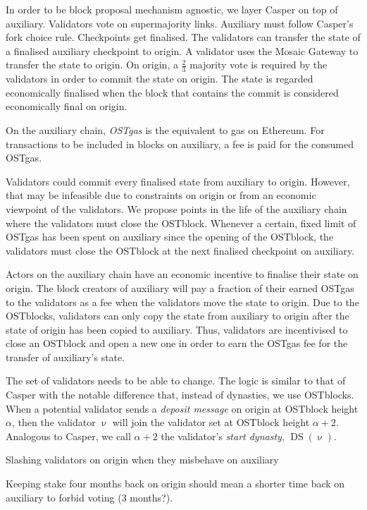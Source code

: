 \documentclass[12pt,a4paper,draft]{article}
\newcommand{\DS}{\operatorname{DS}}
\begin{document}
In order to be block proposal mechanism agnostic, we layer Casper \cite{casperffg} on top of auxiliary.
Validators vote on supermajority links.
Auxiliary must follow Casper's fork choice rule.
Checkpoints get finalised.
The validators can transfer the state of a finalised auxiliary checkpoint to origin.
A validator uses the Mosaic Gateway to transfer the state to origin.
On origin, a $\frac{2}{3	}$ majority vote is required by the validators in order to commit the state on origin.
The state is regarded economically finalised when the block that contains the commit is considered economically final on origin.

On the auxiliary chain, \emph{OSTgas} is the equivalent to gas on Ethereum.
For transactions to be included in blocks on auxiliary, a fee is paid for the consumed OSTgas.

Validators could commit every finalised state from auxiliary to origin.
However, that may be infeasible due to constraints on origin or from an economic viewpoint of the validators.
We propose points in the life of the auxiliary chain where the validators must close the OSTblock.
Whenever a certain, fixed limit of OSTgas has been spent on auxiliary since the opening of the OSTblock,
the validators must close the OSTblock at the next finalised checkpoint on auxiliary. 

Actors on the auxiliary chain have an economic incentive to finalise their state on origin.
The block creators of auxiliary will pay a fraction of their earned OSTgas to the validators as a fee when the validators move the state to origin.
Due to the OSTblocks, validators can only copy the state from auxiliary to origin after the state of origin has been copied to auxiliary.
Thus, validators are incentivised to close an OSTblock and open a new one in order to earn the OSTgas fee for the transfer of auxiliary's state.

The set of validators needs to be able to change.
The logic is similar to that of Casper with the notable difference that, instead of dynasties, we use OSTblocks.
When a potential validator sends a \emph{deposit message} on origin at OSTblock height $\alpha$,
then the validator $\upnu$ will join the validator set at OSTblock height $\alpha+2$.
Analogous to Casper, we call $\alpha+2$ the validator's \emph{start dynasty}, $\DS(\upnu)$.

Slashing validators on origin when they misbehave on auxiliary

Keeping stake four months back on origin should mean a shorter time back on auxiliary to forbid voting (3 months?).
\end{document}
